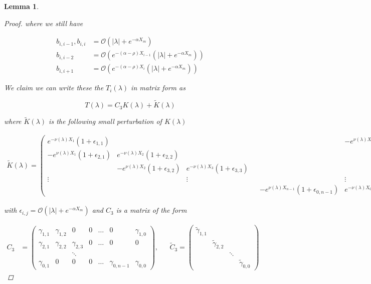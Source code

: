 \documentclass[12pt]{article}
\newtheorem{lemma}{Lemma}
\begin{document}
\begin{lemma}
\begin{proof}
where we still have

\begin{align*}
b_{i,i-1}, b_{i,i} &= \mathcal{O}(|\lambda| + e^{-\alpha X_m}) \\
b_{i,i-2} &= \mathcal{O}(e^{-(\alpha - \rho) X_{i-1}}(|\lambda| + e^{-\alpha X_m})) \\
b_{i,i+1} &= \mathcal{O}(e^{-(\alpha - \rho) X_i}(|\lambda| + e^{-\alpha X_m}))
\end{align*}

We claim we can write these the $T_i(\lambda)$ in matrix form as

\[
T(\lambda) = C_3 K(\lambda) + \tilde{K}(\lambda)
\]

where $\tilde{K}(\lambda)$ is the following small perturbation of $K(\lambda)$

\begin{align*}
\tilde{K}(\lambda) =  
\begin{pmatrix}
e^{-\nu(\lambda)X_1}(1 + \epsilon_{1,1}) & & & & & -e^{\nu(\lambda)X_0}(1 + \epsilon_{1,0}) \\
-e^{\nu(\lambda)X_1}(1 + \epsilon_{2,1}) & e^{-\nu(\lambda)X_2}(1 + \epsilon_{2,2}) \\
& -e^{\nu(\lambda)X_2}(1 + \epsilon_{3,2}) & e^{-\nu(\lambda)X_3}(1 + \epsilon_{3,3}) \\
\vdots & & \vdots & &&  \vdots \\
& & & & -e^{\nu(\lambda)X_{n-1}}(1 + \epsilon_{0,n-1}) & e^{-\nu(\lambda)X_0}(1 + \epsilon_{0,0}) 
\end{pmatrix}
\end{align*}

with $\epsilon_{i,j} = \mathcal{O}(|\lambda| + e^{-\alpha X_m})$ and $C_3$ is a matrix of the form

\begin{align*}
C_3 &= \begin{pmatrix}
\gamma_{1,1} & \gamma_{1,2} & 0 & 0 & \dots & 0 & \gamma_{1,0} \\
\gamma_{2,1} & \gamma_{2,2} & \gamma_{2,3} & 0 & \dots & 0 & 0 \\
&  & \ddots \\
\gamma_{0,1} & 0 & 0 & 0 & \dots & \gamma_{0, n-1} &\gamma_{0,0}
\end{pmatrix}, 
&&\tilde{C}_3 = \begin{pmatrix}
\tilde{\gamma}_{1,1} \\
& \tilde{\gamma}_{2,2} \\
&&\ddots \\
&&& \tilde{\gamma}_{0,0}
\end{pmatrix}
\end{align*}


\end{proof}
\end{lemma}
\end{document}
